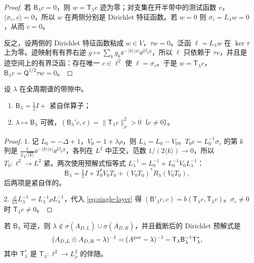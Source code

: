 \documentclass[11pt,a4paper,fontset=fandol]{ctexart}
\begin{document}
\begin{proof}
若 $\mathsf B_\lambda c=0$，则 $w=\mathsf T_\lambda c$ 迹为零；对支集在开半带中的测试函数 $v$，$\langle\sigma_c,v\rangle=0$，所以 $w$ 在两侧分别是 Dirichlet 特征函数。若 $w=0$ 则 $\sigma_c=L_\lambda w=0$，从而 $c=0$。

反之，设两侧的 Dirichlet 特征函数粘成 $w\in V$，$\tau w=0$。泛函 $\ell=L_\lambda w$ 在 $\ker\tau$ 上为零。迹映射有有界右逆 $g\mapsto\sum_kg_k\ee^{-\langle k\rangle|x|}\ee^{\ii\beta_ky}$，所以 $\ell$ 只依赖于 $\tau v$，并且是迹空间上的有界泛函：存在唯一 $c\in\ell^2$ 使 $\ell=\sigma_c$。于是 $w=\mathsf T_\lambda c$，$\mathsf B_\lambda c=\mathsf Q^{1/2}\tau w=0$。
\end{proof}

\begin{lemma}[结构与单调性]
\label{lem:B-structure}
设 $\lambda$ 在全周期谱的带隙中。
\begin{enumerate}
\item $\mathsf B_\lambda=\tfrac12I+$ 紧自伴算子；
\item $\lambda\mapsto\mathsf B_\lambda$ 可微，$(\mathsf B_\lambda'c,c)=\|\mathsf T_\lambda c\|_\rho^2>0$（$c\ne0$）。
\end{enumerate}
\end{lemma}

\begin{proof}
1. 记 $L_0=-\Delta+1$，$V_0=1+\lambda\rho$，则 $L_\lambda=L_0-V_0$。$T_0c=L_0^{-1}\sigma_c$ 的第 $k$ 列是 $\frac1{2\sqrt{\langle k\rangle}}\ee^{-\langle k\rangle|x|}\ee^{\ii\beta_ky}$，各列在 $L^2$ 中正交，范数 $1/(2\langle k\rangle)\to0$，所以 $T_0:\ell^2\to L^2$ 紧。两次使用预解式恒等式 $L_\lambda^{-1}=L_0^{-1}+L_0^{-1}V_0L_\lambda^{-1}$：
\[
\mathsf B_\lambda=\tfrac12I+T_0^*V_0T_0+(V_0T_0)^*R_\lambda(V_0T_0),
\]
后两项是紧自伴的。

2. $\frac{\dd}{\dd\lambda}L_\lambda^{-1}=L_\lambda^{-1}\rho L_\lambda^{-1}$，代入 \eqref{eq:single-layer} 得 $(\mathsf B'_\lambda c,c)=b(\mathsf T_\lambda c,\mathsf T_\lambda c)$。$\sigma_c\ne0$ 时 $\mathsf T_\lambda c\ne0$。
\end{proof}

\begin{lemma}[半导波预解式的表示]
\label{lem:half-resolvent}
若 $\mathsf B_\lambda$ 可逆，则 $\lambda\notin\sigma(A_{D,L})\cup\sigma(A_{D,R})$，并且截断后的 Dirichlet 预解式是
\begin{equation}
\label{eq:half-resolvent}
(A_{D,L}\oplus A_{D,R}-\lambda)^{-1}=(A^{\rm per}-\lambda)^{-1}-\mathsf T_\lambda\mathsf B_\lambda^{-1}\mathsf T_\lambda^{*},
\end{equation}
其中 $\mathsf T_\lambda^*$ 是 $\mathsf T_\lambda:\ell^2\to L^2_\rho$ 的伴随。
\end{lemma}
\end{document}
